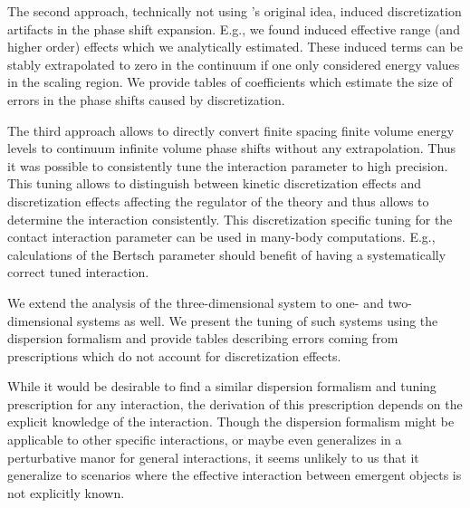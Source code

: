 The second approach, technically not using \Luscher's original idea, induced discretization artifacts in the phase shift expansion.
E.g., we found induced effective range (and higher order) effects which we analytically estimated.
These induced terms can be stably extrapolated to zero in the continuum if one only considered energy values in the scaling region.
We provide tables of coefficients which estimate the size of errors in the phase shifts caused by discretization.

The third approach allows to directly convert finite spacing finite volume energy levels to continuum infinite volume phase shifts without any extrapolation.
Thus it was possible to consistently tune the interaction parameter to high precision.
This tuning allows to distinguish between kinetic discretization effects and discretization effects affecting the regulator of the theory and thus allows to determine the interaction consistently.
This discretization specific tuning for the contact interaction parameter can be used in many-body computations.
E.g., calculations of the Bertsch parameter should benefit of having a systematically correct tuned interaction.

We extend the analysis of the three-dimensional system to one- and two-dimensional systems as well.
We present the tuning of such systems using the dispersion formalism and provide tables describing errors coming from prescriptions which do not account for discretization effects.

While it would be desirable to find a similar dispersion formalism and tuning prescription for any interaction, the derivation of this prescription depends on the explicit knowledge of the interaction.
Though the dispersion formalism might be applicable to other specific interactions, or maybe even generalizes in a perturbative manor for general interactions, it seems unlikely to us that it generalize to scenarios where the effective interaction between emergent objects is not explicitly known.


